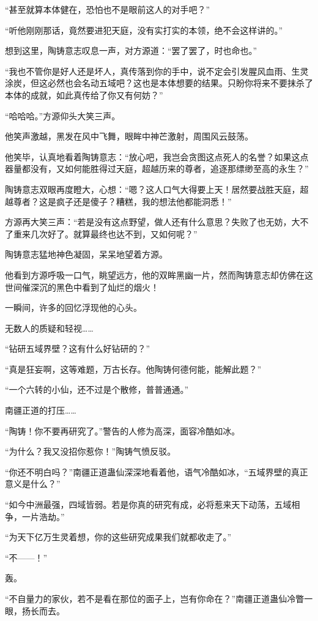 \begin{this_body}
“甚至就算本体健在，恐怕也不是眼前这人的对手吧？”

“听他刚刚那话，竟然要进犯天庭，没有实打实的本领，绝不会这样讲的。”

想到这里，陶铸意志叹息一声，对方源道：“罢了罢了，时也命也。”

“我也不管你是好人还是坏人，真传落到你的手中，说不定会引发腥风血雨、生灵涂炭，但这必然也会名动五域吧？这也是本体想要的结果。只盼你将来不要抹杀了本体的成就，如此真传给了你又有何妨？”

“哈哈哈。”方源仰头大笑三声。

他笑声激越，黑发在风中飞舞，眼眸中神芒激射，周围风云鼓荡。

他笑毕，认真地看着陶铸意志：“放心吧，我岂会贪图这点死人的名誉？如果这点器量都没有，又如何能胜得过天庭，超越历来的尊者，追逐那缥缈至高的永生？”

陶铸意志双眼再度瞪大，心想：“嗯？这人口气大得要上天！居然要战胜天庭，超越尊者？这是疯子还是傻子？糟糕，我的想法他都能洞悉！”

方源再大笑三声：“若是没有这点野望，做人还有什么意思？失败了也无妨，大不了重来几次好了。就算最终也达不到，又如何呢？”

陶铸意志猛地神色凝固，呆呆地望着方源。

他看到方源呼吸一口气，眺望远方，他的双眸黑幽一片，然而陶铸意志却仿佛在这世间催深沉的黑色中看到了灿烂的烟火！

一瞬间，许多的回忆浮现他的心头。

无数人的质疑和轻视……

“钻研五域界壁？这有什么好钻研的？”

“真是狂妄啊，这等难题，万古长存。他陶铸何德何能，能解此题？”

“一个六转的小仙，还不过是个散修，普普通通。”

南疆正道的打压……

“陶铸！你不要再研究了。”警告的人修为高深，面容冷酷如冰。

“为什么？我又没招你惹你！”陶铸气愤反驳。

“你还不明白吗？”南疆正道蛊仙深深地看着他，语气冷酷如冰，“五域界壁的真正意义是什么？”

“如今中洲最强，四域皆弱。若是你真的研究有成，必将惹来天下动荡，五域相争，一片浩劫。”

“为天下亿万生灵着想，你的这些研究成果我们就都收走了。”

“不——！”

轰。

“不自量力的家伙，若不是看在那位的面子上，岂有你命在？”南疆正道蛊仙冷瞥一眼，扬长而去。


\end{this_body}
